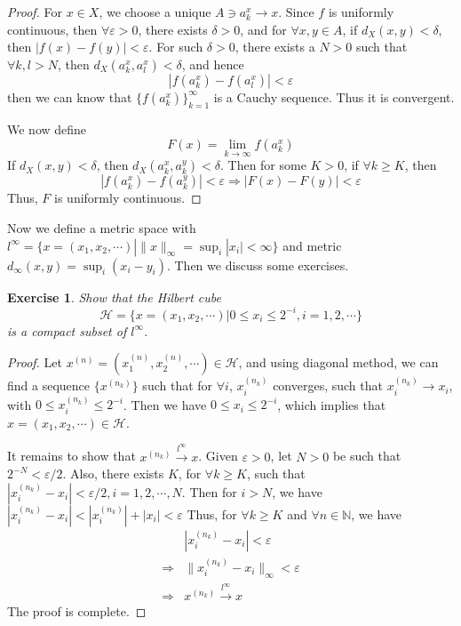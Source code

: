 \documentclass[12pt,leqno]{amsart}
\newtheorem{exercise}{Exercise}[section]
\theoremstyle{definition}
\numberwithin{equation}{subsection}
\begin{document}
\begin{proof}
For $x\in X$, we choose a unique $A\ni a_k^x\to x$. Since $f$ is uniformly continuous, then $\forall\varepsilon > 0$, there exists $\delta > 0$, and for $\forall x,y\in A$, if $d_X(x,y) < \delta$, then $|f(x) - f(y)| < \varepsilon$. For such $\delta > 0$, there exists a $N > 0$ such that $\forall k,l > N$, then $d_X(a_k^x, a_l^x) < \delta$, and hence $$|f(a_k^x) - f(a_l^x)| < \varepsilon$$
then we can know that $\{f(a_k^x)\}^\infty_{k=1}$ is a Cauchy sequence. Thus it is convergent. 

We now define $$F(x) = \lim_{k\to\infty}f(a_k^x)$$
If $d_X(x,y) < \delta$, then $d_X(a_k^x,a_k^y) < \delta$. Then for some $K > 0$, if $\forall k \geq K$, then $$|f(a_k^x) - f(a_k^y)| < \varepsilon \Rightarrow |F(x) - F(y)| < \varepsilon$$
Thus, $F$ is uniformly continuous.
\end{proof}

\medskip

Now we define a metric space with $l^\infty = \{x = (x_1,x_2,\cdots) | \|x\|_\infty = \sup_i |x_i| < \infty\}$ and metric $d_\infty(x,y) = \sup_i (x_i - y_i)$. Then we discuss some exercises. 

\begin{exercise}
Show that the Hilbert cube 
$$\mathcal{H} = \{x = (x_1,x_2,\cdots) | 0\leq x_i \leq 2^{-i}, i = 1,2,\cdots\}$$
is a compact subset of $l^\infty$.
\end{exercise}
\begin{proof}
Let $x^{(n)} = \left(x_1^{(n)},x_2^{(n)},\cdots \right)\in \mathcal{H}$, and using diagonal method, we can find a sequence $\{x^{(n_k)}\}$ such that for $\forall i$, $x_i^{(n_k)}$ converges, such that $x_i^{(n_k)}\to x_i$, with $0\leq x_i^{(n_k)}\leq 2^{-i}$. Then we have $0\leq x_i\leq 2^{-i}$, which implies that $x = \left(x_1, x_2, \cdots \right)\in \mathcal{H}$. 

It remains to show that $x^{(n_k)}\stackrel{l^\infty}{\longrightarrow}x$. Given $\varepsilon > 0$, let $N > 0$ be such that $2^{-N} < \varepsilon/2$. Also, there exists $K$, for $\forall k \geq K$, such that $\left|x_i^{(n_k)} - x_i\right| < \varepsilon/2, i = 1,2,\cdots, N$. Then for $i > N$, we have 
$\left|x_i^{(n_k)} - x_i\right| < \left|x_i^{(n_k)}\right| + |x_i| < \varepsilon$
Thus, for $\forall k \geq K$ and $\forall n\in \mathbb{N}$, we have 
\begin{align*}
    & \left|x_i^{(n_k)} - x_i\right| < \varepsilon \\
    \Rightarrow & \|x_i^{(n_k)} - x_i\|_\infty < \varepsilon \\
    \Rightarrow & x^{(n_k)}\stackrel{l^\infty}{\longrightarrow}x
\end{align*}
The proof is complete.
\end{proof}
\end{document}
